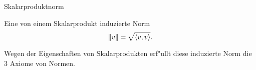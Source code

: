 \documentclass[class=article, crop=false]{standalone}
\begin{document}
\begin{zettel}{Skalarproduktnorm}
\begin{flashcard}[]{}
	\begin{definition}[Skalarproduktnorm]
		Eine von einem Skalarprodukt induzierte Norm
		\[
			\left\|v\right\| = \sqrt{ \langle v,v\rangle}
		.\]
	\end{definition}

\end{flashcard}
\begin{remark}
	Wegen der Eigenschaften von Skalarprodukten erf"ullt diese induzierte Norm die $3$ Axiome von Normen.
\end{remark}
\end{zettel}
\end{document}
